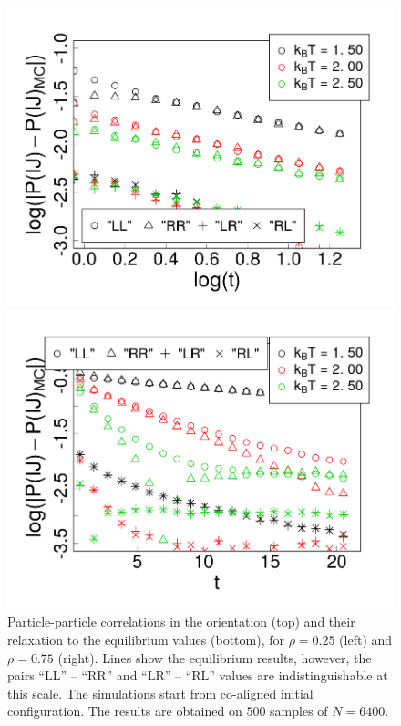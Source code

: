 \begin{figure}[t]
\begin{minipage}[c]{0.8\columnwidth}
	\includegraphics[width=\textwidth]{Images/Particle_probs_relaxation_25}
\end{minipage}
\begin{minipage}[c]{0.8\columnwidth}
	\includegraphics[width=\textwidth]{Images/Particle_probs_relaxation_75}
\end{minipage}
	\caption{Particle-particle correlations in the orientation (top) and their relaxation to the equilibrium values (bottom), for $\rho = 0.25$ (left) and $\rho = 0.75$ (right). Lines show the equilibrium results, however, the pairs ``LL'' -- ``RR'' and ``LR'' -- ``RL'' values are indistinguishable at this scale. The simulations start from co-aligned initial configuration. The results are obtained on $500$ samples of $N = 6400$.}
	\label{fig:prob_relaxation}
\end{figure}


